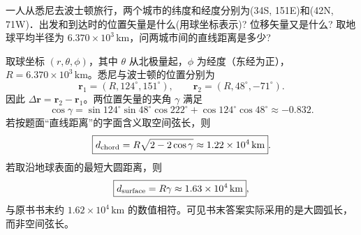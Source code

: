 \begin{exercise}\label{ex:1.21}
一人从悉尼去波士顿旅行，两个城市的纬度和经度分别为(34S, 151E)和(42N, 71W)．出发和到达时的位置矢量是什么(用球坐标表示)? 位移矢量又是什么? 取地球平均半径为 $6.370 \times 10^3\,\mathrm{km}$，问两城市间的直线距离是多少?
\end{exercise}
\begin{solution}
取球坐标 $(r,\theta,\phi)$，其中 $\theta$ 从北极量起，$\phi$ 为经度（东经为正），$R=6.370\times10^3\,\mathrm{km}$。悉尼与波士顿的位置分别为
$$
\boldsymbol r_1=(R,124^\circ,151^\circ),\qquad \boldsymbol r_2=(R,48^\circ,-71^\circ).
$$
因此 $\Delta\boldsymbol r=\boldsymbol r_2-\boldsymbol r_1$。两位置矢量的夹角 $\gamma$ 满足
$$
\cos\gamma=\sin124^\circ\sin48^\circ\cos222^\circ+\cos124^\circ\cos48^\circ\approx-0.832.
$$
若按题面“直线距离”的字面含义取空间弦长，则
$$
\boxed{d_{\rm chord}=R\sqrt{2-2\cos\gamma}\approx1.22\times10^4\,\mathrm{km}}.
$$
若取沿地球表面的最短大圆距离，则
$$
\boxed{d_{\rm surface}=R\gamma\approx1.63\times10^4\,\mathrm{km}},
$$
与原书书末约 $1.62\times10^4\,\mathrm{km}$ 的数值相符。可见书末答案实际采用的是大圆弧长，而非空间弦长。
\end{solution}

